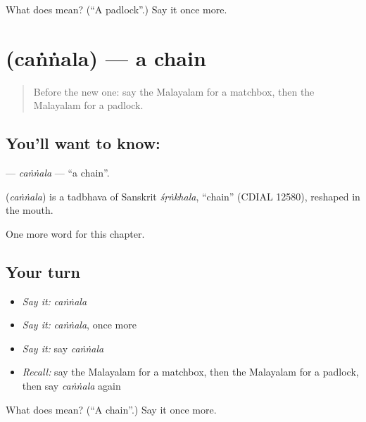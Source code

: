 \begin{tcolorbox}[breakable,colback=teal!4,colframe=teal!35!black,title={Before you move on}]
What does  mean? (\textquotedblleft{}A padlock\textquotedblright{}.) Say it once more.
\end{tcolorbox}
\section[\texorpdfstring{\ml{ചങ്ങല} (caṅṅala)}{ചങ്ങല (caṅṅala)}]{ (caṅṅala) — a chain}

\label{lesson:ML-C294-cannala}



\begin{quote}
Before the new one: say the Malayalam for a matchbox, then the Malayalam for a padlock.
\end{quote}

\subsection*{You'll want to know: }
\textbf{} — \emph{caṅṅala} — \textquotedblleft{}a chain\textquotedblright{}.

\begin{cousinweb}
\textbf{} (\emph{caṅṅala}) is a tadbhava of Sanskrit \emph{śṛṅkhala}, \textquotedblleft{}chain\textquotedblright{} (CDIAL 12580), reshaped in the mouth.
\end{cousinweb}

\begin{grammarlens}[title={What you've built}]
One more word for this chapter.
\end{grammarlens}

\subsection*{Your turn}
\begin{itemize}
\raggedright
  \item \emph{Say it:} \emph{caṅṅala}
  \item \emph{Say it:} \emph{caṅṅala}, once more
  \item \emph{Say it:} say \emph{caṅṅala}
  \item \emph{Recall:} say the Malayalam for a matchbox, then the Malayalam for a padlock, then say \emph{caṅṅala} again
\end{itemize}

\begin{tcolorbox}[breakable,colback=teal!4,colframe=teal!35!black,title={Before you move on}]
What does  mean? (\textquotedblleft{}A chain\textquotedblright{}.) Say it once more.
\end{tcolorbox}
